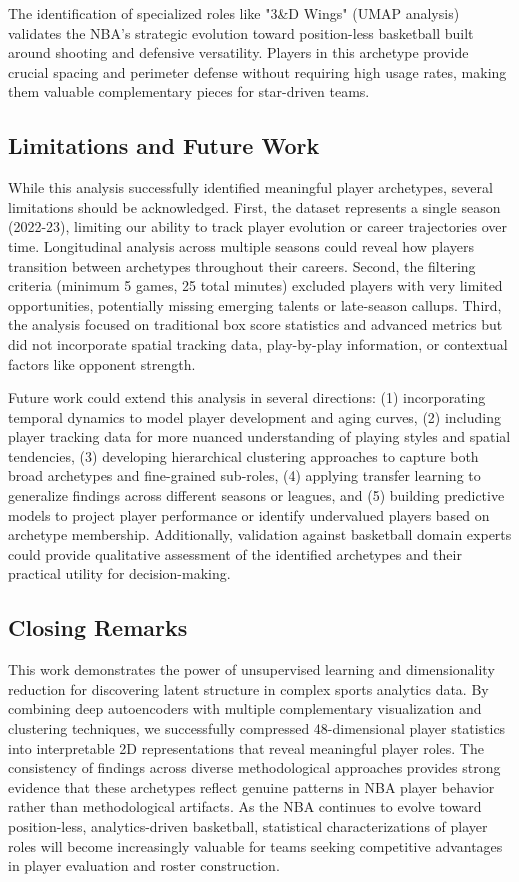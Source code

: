 \documentclass{article}
\begin{document}
The identification of specialized roles like "3\&D Wings" (UMAP analysis) validates the NBA's strategic evolution toward position-less basketball built around shooting and defensive versatility. Players in this archetype provide crucial spacing and perimeter defense without requiring high usage rates, making them valuable complementary pieces for star-driven teams.

\subsection{Limitations and Future Work}

While this analysis successfully identified meaningful player archetypes, several limitations should be acknowledged. First, the dataset represents a single season (2022-23), limiting our ability to track player evolution or career trajectories over time. Longitudinal analysis across multiple seasons could reveal how players transition between archetypes throughout their careers. Second, the filtering criteria (minimum 5 games, 25 total minutes) excluded players with very limited opportunities, potentially missing emerging talents or late-season callups. Third, the analysis focused on traditional box score statistics and advanced metrics but did not incorporate spatial tracking data, play-by-play information, or contextual factors like opponent strength.

Future work could extend this analysis in several directions: (1) incorporating temporal dynamics to model player development and aging curves, (2) including player tracking data for more nuanced understanding of playing styles and spatial tendencies, (3) developing hierarchical clustering approaches to capture both broad archetypes and fine-grained sub-roles, (4) applying transfer learning to generalize findings across different seasons or leagues, and (5) building predictive models to project player performance or identify undervalued players based on archetype membership. Additionally, validation against basketball domain experts could provide qualitative assessment of the identified archetypes and their practical utility for decision-making.

\subsection{Closing Remarks}

This work demonstrates the power of unsupervised learning and dimensionality reduction for discovering latent structure in complex sports analytics data. By combining deep autoencoders with multiple complementary visualization and clustering techniques, we successfully compressed 48-dimensional player statistics into interpretable 2D representations that reveal meaningful player roles. The consistency of findings across diverse methodological approaches provides strong evidence that these archetypes reflect genuine patterns in NBA player behavior rather than methodological artifacts. As the NBA continues to evolve toward position-less, analytics-driven basketball, statistical characterizations of player roles will become increasingly valuable for teams seeking competitive advantages in player evaluation and roster construction.
\end{document}
